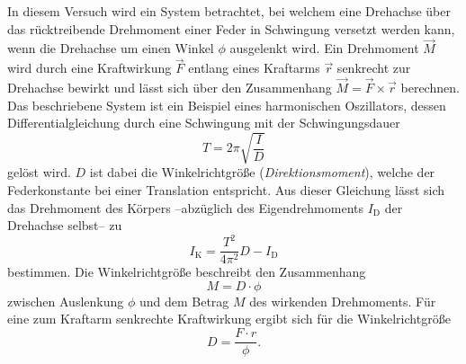 In diesem Versuch wird ein System betrachtet, bei welchem eine Drehachse über das rücktreibende Drehmoment einer Feder in Schwingung versetzt werden kann, wenn die Drehachse
um einen Winkel $\phi$ ausgelenkt wird. Ein Drehmoment $\vec{M}$ wird durch eine Kraftwirkung $\vec{F}$ entlang eines Kraftarms $\vec{r}$ senkrecht zur Drehachse bewirkt und 
lässt sich über den Zusammenhang $\vec{M} = \vec{F} \times \vec{r}$ berechnen.
Das beschriebene System ist ein Beispiel eines harmonischen Oszillators, dessen Differentialgleichung durch eine Schwingung mit der Schwingungsdauer 
\begin{equation}
    \label{eqn:Schwingungsdauer}
    T = 2\pi \sqrt{\frac{I}{D}}
\end{equation}
gelöst wird. $D$ ist dabei die Winkelrichtgröße (\textit{Direktionsmoment}), welche der Federkonstante bei einer Translation entspricht. Aus dieser Gleichung lässt sich das Drehmoment 
des Körpers --abzüglich des Eigendrehmoments $I_\text{D}$ der Drehachse selbst-- zu
\begin{equation}
    \label{eqn:I_K}
    I_\text{K} = \frac{T^2}{4\pi^2}D - I_\text{D}
\end{equation}
bestimmen.
Die Winkelrichtgröße beschreibt den Zusammenhang 
\begin{equation*}
    M = D \cdot \phi
\end{equation*}
zwischen Auslenkung $\phi$ und dem Betrag $M$ des wirkenden Drehmoments. Für eine zum Kraftarm senkrechte Kraftwirkung ergibt sich für die Winkelrichtgröße
\begin{equation}
    \label{eqn:Winkelrichtgröße}
    D = \frac{F \cdot r}{\phi}.
\end{equation}
